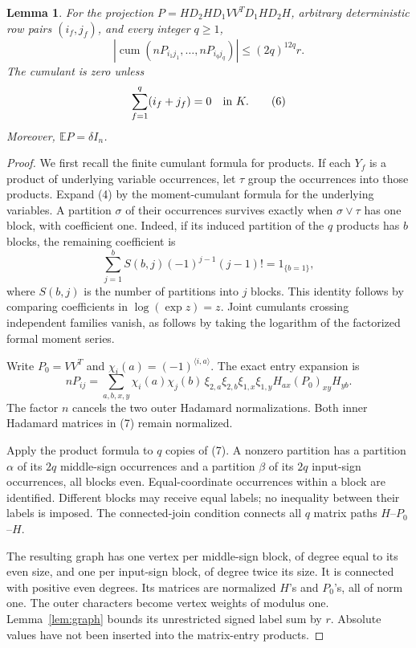 \documentclass[11pt]{article}
\newtheorem{lemma}[theorem]{Lemma}
\theoremstyle{definition}
\newcommand{\E}{\mathbb E}
\DeclareMathOperator{\cum}{cum}
\begin{document}
\begin{lemma}\label{lem:cumulants}
For the projection \(P=HD_2HD_1VV^TD_1HD_2H\), arbitrary deterministic
row pairs \((i_f,j_f)\), and every integer \(q\ge1\),
\[
 \left|\cum(nP_{i_1j_1},\ldots,nP_{i_qj_q})\right|
                      \le (2q)^{12q}r.                         \tag{5}
\]
The cumulant is zero unless
\[
                 \sum_{f=1}^q(i_f+j_f)=0\quad\hbox{in }K.        \tag{6}
\]
Moreover, \(\E P=\delta I_n\).
\end{lemma}
\begin{proof}
We first recall the finite cumulant formula for products. If each
\(Y_f\) is a product of underlying variable occurrences, let \(\tau\)
group the occurrences into those products. Expand (4) by the
moment-cumulant formula for the underlying variables. A partition
\(\sigma\) of their occurrences survives exactly when
\(\sigma\vee\tau\) has one block, with coefficient one. Indeed, if its
induced partition of the \(q\) products has \(b\) blocks, the remaining
coefficient is
\[
 \sum_{j=1}^b S(b,j)(-1)^{j-1}(j-1)!=1_{\{b=1\}},
\]
where \(S(b,j)\) is the number of partitions into \(j\) blocks.
This identity follows by comparing coefficients in
\(\log(\exp z)=z\). Joint cumulants crossing independent families
vanish, as follows by taking the logarithm of the factorized formal
moment series.

Write \(P_0=VV^T\) and \(\chi_i(a)=(-1)^{\langle i,a\rangle}\).
The exact entry expansion is
\[
 nP_{ij}=\sum_{a,b,x,y}
 \chi_i(a)\chi_j(b)\,
 \xi_{2,a}\xi_{2,b}\xi_{1,x}\xi_{1,y}
                  H_{ax}(P_0)_{xy}H_{yb}.                       \tag{7}
\]
The factor \(n\) cancels the two outer Hadamard normalizations.
Both inner Hadamard matrices in (7) remain normalized.

Apply the product formula to \(q\) copies of (7). A nonzero partition
has a partition \(\alpha\) of its \(2q\) middle-sign occurrences and
a partition \(\beta\) of its \(2q\) input-sign occurrences, all blocks
even. Equal-coordinate occurrences within a block are identified.
Different blocks may receive equal labels; no inequality between
their labels is imposed. The connected-join condition connects all
\(q\) matrix paths \(H\)--\(P_0\)--\(H\).

The resulting graph has one vertex per middle-sign block, of degree
equal to its even size, and one per input-sign block, of degree twice
its size. It is connected with positive even degrees. Its matrices
are normalized \(H\)'s and \(P_0\)'s, all of norm one. The outer
characters become vertex weights of modulus one.
Lemma~\ref{lem:graph} bounds its unrestricted signed label sum by \(r\).
Absolute values have not been inserted into the matrix-entry products.


\end{proof}
\end{document}
